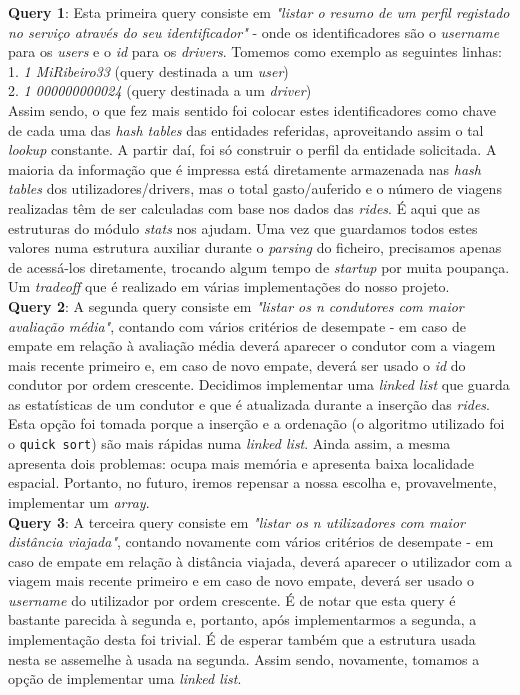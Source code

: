 \documentclass[12pt,a4paper]{report}
\begin{document}
    \textbf{Query 1}: Esta primeira query consiste em \textit{"listar o resumo de um perfil registado no serviço através do seu identificador"} - onde os identificadores são o \textit{username} para os \textit{users} e o \textit{id} para os \textit{drivers}. Tomemos como exemplo as seguintes linhas: \\
    1. \textit{1 MiRibeiro33} (query destinada a um \textit{user}) \\
    2. \textit{1 000000000024} (query destinada a um \textit{driver}) \\ 
    Assim sendo, o que fez mais sentido foi colocar estes identificadores como chave de cada uma das \textit{hash tables} das entidades referidas, aproveitando assim o tal \textit{lookup} constante. A partir daí, foi só construir o perfil da entidade solicitada. A maioria da informação que é impressa está diretamente armazenada nas \textit{hash tables} dos utilizadores/drivers, mas o total gasto/auferido e o número de viagens realizadas têm de ser calculadas com base nos dados das \textit{rides}. É aqui que as estruturas do módulo \textit{stats} nos ajudam. Uma vez que guardamos todos estes valores numa estrutura auxiliar durante o \textit{parsing} do ficheiro, precisamos apenas de acessá-los diretamente, trocando algum tempo de \textit{startup} por muita poupança. Um \textit{tradeoff} que é realizado em várias implementações do nosso projeto.
    \\
    \textbf{Query 2}: A segunda query consiste em \textit{"listar os n condutores com maior avaliação média"}, contando com vários critérios de desempate - em caso de empate em relação à avaliação média deverá aparecer o condutor com a viagem mais recente primeiro e, em caso de novo empate, deverá ser usado o \textit{id} do condutor por ordem crescente. Decidimos implementar uma \textit{linked list} que guarda as estatísticas de um condutor e que é atualizada durante a inserção das \textit{rides}.
    Esta opção foi tomada porque a inserção e a ordenação (o algoritmo utilizado foi o \texttt{quick sort}) são mais rápidas numa \textit{linked list}. Ainda assim, a mesma apresenta dois problemas: ocupa mais memória e apresenta baixa localidade espacial. Portanto, no futuro, iremos repensar a nossa escolha e, provavelmente, implementar um \textit{array}.
    \\
    \textbf{Query 3}: A terceira query consiste em \textit{"listar os n utilizadores com maior distância viajada"}, contando novamente com vários critérios de desempate - em caso de empate em relação à distância viajada, deverá aparecer o utilizador com a viagem mais recente primeiro e em caso de novo empate, deverá ser usado o \textit{username} do utilizador por ordem crescente. É de notar que esta query é bastante parecida à segunda e, portanto, após implementarmos a segunda, a implementação desta foi trivial. É de esperar também que a estrutura usada nesta se assemelhe à usada na segunda. Assim sendo, novamente, tomamos a opção de implementar uma \textit{linked list}.
\end{document}
